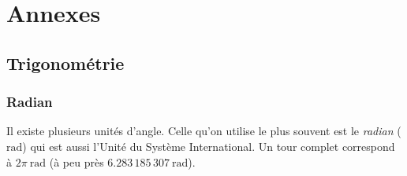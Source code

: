 \chapter{Annexes}
      \section{Trigonom\'etrie}
            \subsection{Radian}
            \newcommand{\rad}{\mathrm{rad}}
                  Il existe plusieurs unit\'es d'angle. 
                  Celle qu'on utilise le plus souvent est le \emph{radian} ($\rad$)
                  qui est aussi l'Unit\'e du Syst\`eme International.
                  Un tour complet correspond \`a $2\pi~\rad$ (\`a peu pr\`es $6.283\,185\,307~\rad$).
